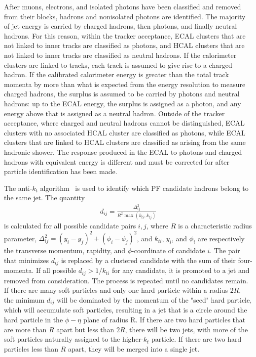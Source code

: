 After muons, electrons, and isolated photons have been classified and removed
from their blocks, hadrons and nonisolated photons are identified. The majority
of jet energy is carried by charged hadrons, then photons, and finally neutral
hadrons. For this reason, within the tracker acceptance, ECAL clusters that are
not linked to inner tracks are classified as photons, and HCAL clusters that are
not linked to inner tracks are classified as neutral hadrons. If the calorimeter
clusters are linked to tracks, each track is assumed to give rise to a charged
hadron. If the calibrated calorimeter energy is greater than the total track
momenta by more than what is expected from the energy resolution to measure
charged hadrons, the surplus is assumed to be carried by photons and neutral
hadrons: up to the ECAL energy, the surplus is assigned as a photon, and any
energy above that is assigned as a neutral hadron. Outside of the tracker
acceptance, where charged and neutral hadrons cannot be distinguished, ECAL
clusters with no associated HCAL cluster are classified as photons, while ECAL
clusters that are linked to HCAL clusters are classified as arising from the
same hadronic shower. The response produced in the ECAL to photons and charged
hadrons with equivalent energy is different and must be corrected for after
particle identification has been made.

The anti-$k_t$ algorithm~\cite{1126-6708-2008-04-063} is used to identify which
PF candidate hadrons belong to the same jet. The quantity
\begin{eqnarray}
  d_{ij} = \frac{\Delta_{ij}^2}{R^2 \max(k_{ti}, k_{tj})}
\end{eqnarray}
is calculated for all possible candidate pairs $i,j$, where $R$ is a
characteristic radius parameter, $\Delta_{ij}^2 = (y_i - y_j)^2 +
(\phi_i-\phi_j)^2$, and $k_{ti}$, $y_i$, and $\phi_i$ are respectively the
transverse momentum, rapidity, and $\phi$-coordinate of candidate $i$. The pair
that minimizes $d_{ij}$ is replaced by a clustered candidate with the sum of
their four-momenta. If all possible $d_{ij} > 1/k_{ti}$ for any candidate, it is
promoted to a jet and removed from consideration. The process is repeated until
no candidates remain. If there are many soft particles and only one hard
particle within a radius $2R$, the minimum $d_{ij}$ will be dominated by the
momentum of the "seed" hard particle, which will accumulate soft particles,
resulting in a jet that is a circle around the hard particle in the $\phi-\eta$
plane of radius R. If there are two hard particles that are more than $R$ apart
but less than $2R$, there will be two jets, with more of the soft particles
naturally assigned to the higher-$k_t$ particle. If there are two hard particles
less than $R$ apart, they will be merged into a single jet.

